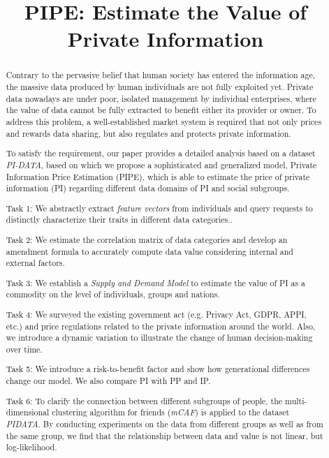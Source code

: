 \documentclass{mcmthesis}
\begin{document}
\linespread{0.6} %
\setlength{\parskip}{0.5\baselineskip} %
\title{PIPE: Estimate the Value of Private Information}

\date{}
	\begin{abstract}
	
Contrary to the pervasive belief that human society has entered the information age, the massive data produced by human individuals are not fully exploited yet. Private data nowadays are under poor, isolated management by individual enterprises, where the value of data cannot be fully extracted to benefit either its provider or owner. To address this problem, a well-established market system is required that not only prices and rewards data sharing, but also regulates and protects private information.

To satisfy the requirement, our paper provides a detailed analysis based on a dataset \emph{PI-DATA}, based on which we propose a sophisticated and generalized model, Private Information Price Estimation (PIPE), which is able to estimate the price of private information (PI) regarding different data domains of PI and social subgroups.

Task 1: We abstractly extract \emph{feature vectors} from individuals and query requests to distinctly characterize their traits in different data categories.. 

Task 2: We estimate the correlation matrix of data categories and develop an amendment formula to accurately compute data value considering internal and external factors.

Task 3: We establish a \emph{Supply and Demand Model} to estimate the value of PI as a commodity on the level of individuals, groups and nations.

Task 4: We surveyed the existing government act (e.g. Privacy Act, GDPR, APPI, etc.) and price regulations related to the private information around the world. Also, we introduce a dynamic variation to illustrate the change of human decision-making over time.

Task 5: We introduce a risk-to-benefit factor and show how generational differences change our model. We also compare PI with PP and IP.

Task 6: To clarify the connection between different subgroups of people, the multi-dimensional clustering algorithm for friends (\emph{mCAF}) is applied to the dataset \emph{PIDATA}. By conducting experiments on the data from different groups as well as from the same group, we find that the relationship between data and value is not linear, but log-likelihood.


\end{abstract}
\end{document}
